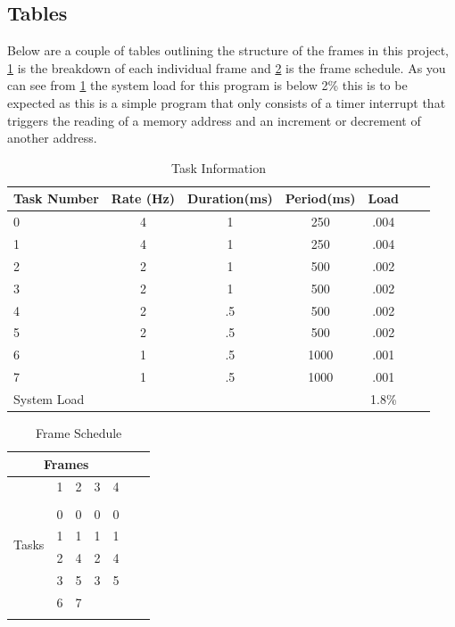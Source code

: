 \documentclass[10pt,a4paper]{article}
\begin{document}
	\subsection{Tables}
	Below are a couple of tables outlining the structure of the frames in this project, \ref{taskDes} is the breakdown of each individual frame and \ref{frameSch} is the frame schedule. As you can see from \ref{taskDes} the system load for this program is below 2\% this is to be expected as this is a simple program that only consists of a timer interrupt that triggers the reading of a memory address and an increment or decrement of another address.
	\begin{center}
		\begin{table}[ht]
			\centering
			\caption{Task Information}
			\begin{tabular}{l*{5}{c}r}
				\hline
				Task Number & Rate (Hz) & Duration(ms) & Period(ms) & Load \\
				\hline
				0  & 4 & 1 & 250 & .004  \\
				1 & 4 & 1 & 250 &  .004  \\
				2  & 2 & 1 & 500 & .002 \\
				3  & 2 & 1 & 500 & .002   \\
				4  & 2 & .5 & 500 & .002   \\
				5  & 2 & .5 & 500 & .002   \\
				6  & 1 & .5 & 1000 & .001   \\
				7  & 1 & .5 & 1000 &  .001  \\
				\hline
				System Load & & & & 1.8\%
				\label{taskDes}
			\end{tabular}
		\end{table}
	
	\begin{table}[h]
		\centering
		\caption{Frame Schedule}
		\begin{tabular}{l*{5}{c}r}
			\hline
			\multicolumn{5}{c}{Frames} \\
			\hline
			& 1 & 2 & 3 & 4 \\
			\hline
			\multirow{5}{*}{Tasks} \\
			& 0 & 0 & 0 & 0 \\
			& 1 & 1 & 1 & 1 \\
			& 2 & 4 & 2 & 4 \\
			& 3 & 5 & 3 & 5 \\
			& 6 & 7 &   &   \\
			\hline
			\label{frameSch}
		\end{tabular}
	\end{table}
	\end{center}
\end{document}
